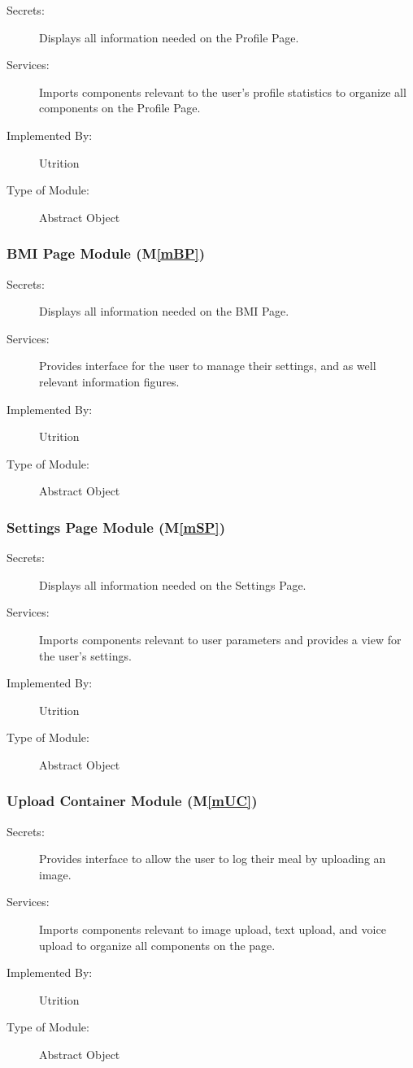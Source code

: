 \documentclass[12pt, titlepage]{article}
\newcommand{\mref}[1]{M\ref{#1}}
\begin{document}
\begin{description}
\item[Secrets:]Displays all information needed on the Profile Page.
\item[Services:] Imports components relevant to the user's profile statistics to organize all components on the Profile Page.
\item[Implemented By:] Utrition
\item[Type of Module:] Abstract Object
\end{description}

\subsubsection{BMI Page Module (\mref{mBP})}

\begin{description}
	\item[Secrets:]Displays all information needed on the BMI Page.
	\item[Services:] Provides interface for the user to manage their settings, 
	and as well relevant information figures.
	\item[Implemented By:] Utrition
	\item[Type of Module:] Abstract Object
\end{description}

\subsubsection{Settings Page Module (\mref{mSP})}

\begin{description}
	\item[Secrets:]Displays all information needed on the Settings Page.
	\item[Services:] Imports components relevant to user parameters and 
	provides a view for the user's settings.
	\item[Implemented By:] Utrition
	\item[Type of Module:] Abstract Object
\end{description}

\subsubsection{Upload Container Module (\mref{mUC})}

\begin{description}
	\item[Secrets:]Provides interface to allow the user to log their meal by 
	uploading an image.
	\item[Services:]Imports components relevant to image upload, text upload, 
	and voice upload to organize all components on the page.
	\item[Implemented By:] Utrition
	\item[Type of Module:] Abstract Object
\end{description}
\end{document}
